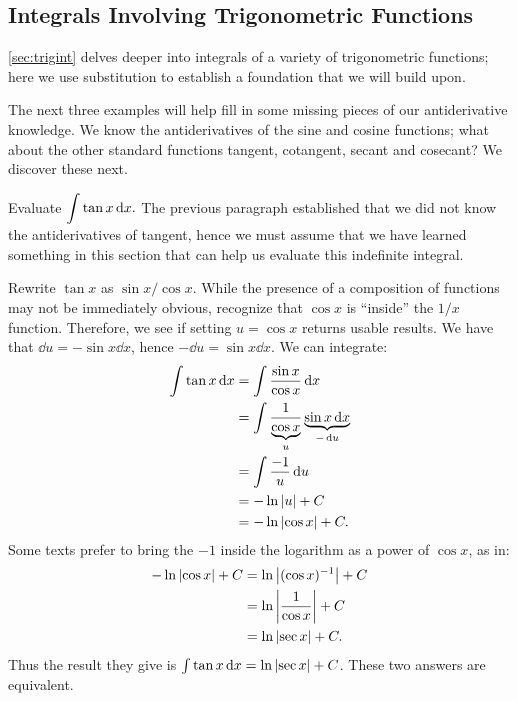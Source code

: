 \subsection{Integrals Involving Trigonometric Functions}

\autoref{sec:trigint} delves deeper into integrals of a variety of trigonometric functions; here we use substitution to establish a foundation that we will build upon. 

The next three examples will help fill in some missing pieces of our antiderivative knowledge. We know the antiderivatives of the sine and cosine functions; what about the other standard functions tangent, cotangent, secant and cosecant? We discover these next.

\begin{example}\label{ex_sub6}%
Evaluate $\displaystyle \int \tan x\operatorname{d}\! x.$
\solution
The previous paragraph established that we did not know the antiderivatives of tangent, hence we must assume that we have learned something in this section that  can help us evaluate this indefinite integral. 

Rewrite $\tan x$ as $\sin x/\cos x$. While the presence of a composition of functions may not be immediately obvious, recognize that $\cos x$ is ``inside'' the $1/x$ function. Therefore, we see if setting $u = \cos x$ returns usable results. We have that $\dd u = -\sin x\dd x$, hence $-\dd u = \sin x\dd x$. We can integrate:
\begin{align*}
	\int \tan x \operatorname{d}\! x
	&= \int \frac{\sin x}{\cos x}\operatorname{d}\! x \\
	&= \int \frac1{\underbrace{\cos x}_u}\underbrace{\sin x\operatorname{d}\! x}_{-\operatorname{d}\! u} \\
	&= \int \frac {-1}u \operatorname{d}\! u\\
	&= -\ln \left\lvert u \right\rvert + C \\
	&= -\ln \left\lvert \cos x \right\rvert + C.
\end{align*}
Some texts prefer to bring the $-1$ inside the logarithm as a power of $\cos x$, as in:
\begin{align*}
	-\ln\left\lvert \cos x \right\rvert + C
	&= \ln\left\lvert (\cos x)^{-1} \right\rvert + C\\
	&= \ln \left\lvert \frac{1}{\cos x} \right\rvert + C\\
	&= \ln \left\lvert \sec x \right\rvert + C.
\end{align*}
Thus the result they give is $\int \tan x \operatorname{d}\! x = \ln\left\lvert \sec x \right\rvert+C$. These two answers are equivalent.
\end{example}


